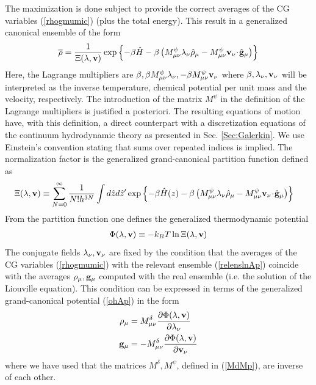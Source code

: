 \documentclass[b5paper,openright,10pt]{book}
\newcommand{\esc}{\!\cdot\!}
\begin{document}
\begin{appendices}
The maximization is done
subject  to  provide   the  correct  averages  of   the  CG  variables
(\ref{rhogmumic})  (plus   the  total   energy).  This  result   in  a
generalized canonical ensemble of the form
\begin{eqnarray}
  \overline{\rho}=\frac{1}{\Xi(\lambda,{\bf v})}\exp\left\{-\beta \hat{H}
-\beta\left(M^\psi_{\mu\nu}\lambda_\nu \hat{\rho}_{\mu}
-M^\psi_{\mu\nu}{\bf v}_\nu\esc\hat{\bf g}_{\mu}\right)\right\}
\label{relenslnAp}
\end{eqnarray}
Here,      the     Lagrange      multipliers     are      $\beta,\beta
M^\psi_{\mu\nu}\lambda_\nu,-\beta  M^\psi_{\mu\nu}{\bf   v}_\nu$  where
$\beta, \lambda_\nu,{\bf  v}_\nu$ will  be interpreted as  the inverse
temperature,  chemical  potential  per  unit mass  and  the  velocity,
respectively.
The introduction of the matrix $M^\psi$ in the definition of the Lagrange multipliers is justified a posteriori. 
The resulting equations of motion have, with this definition, a direct counterpart with a discretization equations of the continuum hydrodynamic theory as presented in Sec. \ref{Sec:Galerkin}.
We use Einstein’s convention stating that sums over repeated indices is implied.
The   normalization   factor   is   the   generalized
grand-canonical partition function defined as
\begin{align}
&\Xi(\lambda,{\bf v})\equiv \sum_{N=0}^\infty \frac{1}{N!h^{3N}}
  \int d\hat{z}d\hat{z}'
  \exp\left\{-\beta \hat{H}(z)-\beta\left( M^\psi_{\mu\nu}\lambda_\nu\hat{\rho}_{\mu}
-M^\psi_{\mu\nu}{\bf v}_\nu\esc\hat{\bf g}_{\mu}\right)\right\}
\label{xiln0}
\end{align}
From the partition function one defines the generalized thermodynamic potential
\begin{eqnarray}
  \Phi (\lambda,{\bf v})\equiv-k_BT \ln\Xi (\lambda,{\bf v})
\label{ohAp}
\end{eqnarray}
The  conjugate  fields  $\lambda_\nu,{\bf  v}_\nu$ are  fixed  by  the
condition that the averages of the CG variables (\ref{rhogmumic}) with
the  relevant ensemble  (\ref{relenslnAp})  coincide  with the  averages
$\rho_\mu,{\bf g}_\mu$ computed with the  real ensemble (i.e. the
solution of the Liouville equation). This condition can be expressed in terms of
the generalized grand-canonical potential (\ref{ohAp})
in the form
\begin{align}
  \rho_\mu &=M^\delta_{\mu\nu}\frac{\partial \Phi(\lambda,{\bf v})}{\partial \lambda_\nu }
\nonumber\\
  {\bf g}_\mu &=-M^\delta_{\mu\nu}\frac{\partial \Phi(\lambda,{\bf v})}{\partial {\bf v}_\nu }
\label{rgoApp}
\end{align}
where we have used that the matrices $M^\delta, M^\psi$, defined in (\ref{MdMp}), are inverse of
each other.  


\end{appendices}
\end{document}

